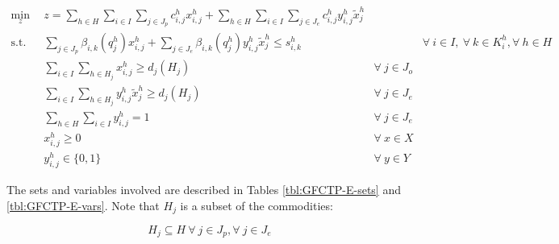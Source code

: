 \begin{subequations}\label{eqs:GFCTP-E}
  \begin{align}
    \label{eq:GRCTP-E_obj}
    \min_{z} \:\: 
    & 
    z = \sum_{h \in H}\sum_{i \in I}\sum_{j \in J_{p}}c_{i,j}^{h} x_{i,j}^{h} 
    + \sum_{h \in H}\sum_{i \in I}\sum_{j \in J_{e}}c_{i,j}^{h} y_{i,j}^{h} \tilde{x}_{j}^{h}
    && \\
    \label{eq:GRCTP-E_sup}
    \text{s.t.} \:\: 
    &
    \sum_{j \in J_{p}}\beta_{i,k}(q_{j}^{h}) x_{i,j}^{h}
    + \sum_{j \in J_{e}}\beta_{i,k}(q_{j}^{h}) y_{i,j}^{h} \tilde{x}_{j}^{h} \leq s_{i,k}^{h} 
    &&
    \forall \: i \in I, \: \forall \: k \in K_{i}^{h}, \forall \: {h \in H} \\
    \label{eq:GRCTP-E_dem_p}
    &
    \sum_{i \in I}\sum_{h \in H_{j}} x_{i,j}^{h} \geq d_{j}(H_{j}) 
    & 
    \forall \: j \in J_{o} &\\
    \label{eq:GRCTP-E_dem_e}
    &
    \sum_{i \in I}\sum_{h \in H_{j}} y_{i,j}^{h} \tilde{x}_{j}^{h} \geq d_{j}(H_{j}) 
    &
    \forall \: j \in J_{e}  &\\
    \label{eq:GRCTP-E_sumy}
    &
    \sum_{h \in H}\sum_{i \in I} y_{i,j}^{h} = 1
    &
    \forall \: j \in J_{e}  &\\
    \label{eq:GRCTP-E_x}
    &
    x_{i,j}^{h} \geq 0
    &
    \forall \: x \in X  &\\
    \label{eq:GRCTP-E_y}
    &
    y_{i,j}^{h} \in \{0,1\}
    &
    \forall \: y \in Y &
  \end{align}
\end{subequations}

The sets and variables involved are described in Tables \ref{tbl:GFCTP-E-sets}
and \ref{tbl:GFCTP-E-vars}. Note that $H_{j}$ is a subset of the commodities:

\begin{equation}
  H_{j} \subseteq H \: \forall \: j \in J_{p}, \forall \: j \in J_{e}
\end{equation}


